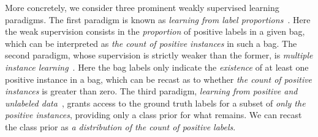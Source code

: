 \documentclass{article}
\begin{document}
More concretely, we consider three prominent weakly supervised learning paradigms. 
The first paradigm is known as \emph{learning from label proportions}~\citep{quadrianto2008llp}.
Here the weak supervision consists in the \emph{proportion} of 
positive labels in a given bag, which can be interpreted
as \emph{the count of positive instances} in such a bag.
The second paradigm, whose supervision is strictly weaker
than the former, is \emph{multiple instance learning}~\citep{MIL1997framework, dietterich1997musk}.
Here the bag labels only indicate the \emph{existence} of
at least one positive instance in a bag, which can
be recast as to whether \emph{the count of positive 
instances} is greater than zero.
The third paradigm, \emph{learning from positive and unlabeled data}~\citep{PUoriginal, PUoriginal2}, grants access to the ground truth labels for a subset of \emph{only the positive instances}, providing only a class prior for what remains. We can recast the class prior as \emph{a distribution of the count of positive labels}.
\end{document}
